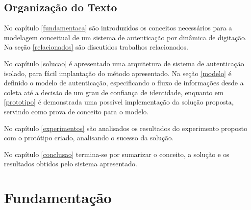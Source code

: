 \documentclass[pfc]{imetex}
\begin{document}
\section{Organização do Texto}
No capítulo \ref{fundamentaca} são introduzidos os conceitos necessários para a modelagem conceitual de um sistema de autenticação por dinâmica de digitação. Na seção \ref{relacionados} são discutidos trabalhos relacionados.

No capítulo \ref{solucao} é apresentado uma arquitetura de sistema de autenticação isolado, para fácil implantação do método apresentado. Na seção \ref{modelo} é definido o modelo de autenticação, especificando o fluxo de informações desde a coleta até a decisão de um grau de confiança de identidade, enquanto em \ref{prototipo} é demonstrada uma possível implementação da solução proposta, servindo como prova de conceito para o modelo.

No capítulo \ref{experimentos} são analisados os resultados do experimento proposto com o protótipo criado, analisando o sucesso da solução.

No capítulo \ref{conclusao} termina-se por sumarizar o conceito, a solução e os resultados obtidos pelo sistema apresentado.

\chapter{Fundamentação}
\end{document}
